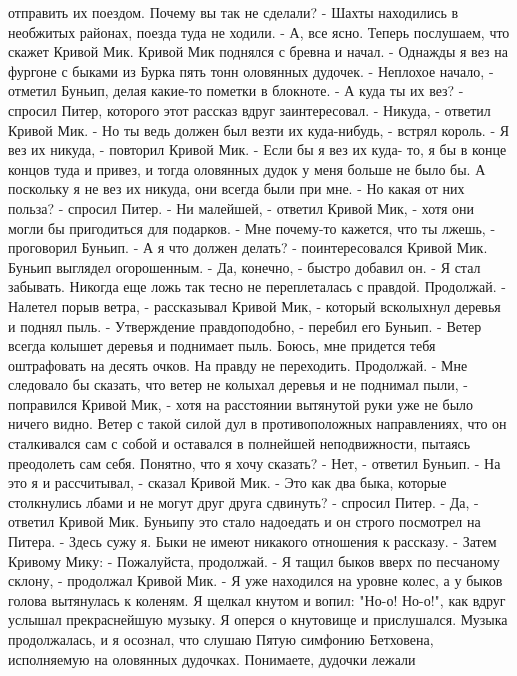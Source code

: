 отправить их поездом. Почему вы так не сделали?
    - Шахты находились в необжитых районах, поезда туда не ходили.
    - А, все ясно. Теперь послушаем, что скажет Кривой Мик.
    Кривой Мик поднялся с бревна и начал.
    - Однажды я вез на фургоне с быками из Бурка пять тонн оловянных 
дудочек.
    - Неплохое начало, - отметил Буньип, делая какие-то пометки в 
блокноте.
    - А куда ты их вез? - спросил Питер, которого этот рассказ вдруг 
заинтересовал.
    - Никуда, - ответил Кривой Мик.
    - Но ты ведь должен был везти их куда-нибудь, - встрял король.
    - Я вез их никуда, - повторил Кривой Мик. - Если бы я вез их куда-
то, я бы в конце концов туда и привез, и тогда оловянных дудок у меня 
больше не было бы. А поскольку я не вез их никуда, они всегда были при 
мне.
    - Но какая от них польза? - спросил Питер.
    - Ни малейшей, - ответил Кривой Мик, - хотя они могли бы 
пригодиться для подарков.
    - Мне почему-то кажется, что ты лжешь, - проговорил Буньип.
    - А я что должен делать? - поинтересовался Кривой Мик.
    Буньип выглядел огорошенным.
    - Да, конечно, - быстро добавил он. - Я стал забывать. Никогда еще 
ложь так тесно не переплеталась с правдой. Продолжай.
    - Налетел порыв ветра, - рассказывал Кривой Мик, - который 
всколыхнул деревья и поднял пыль.
    - Утверждение правдоподобно, - перебил его Буньип. - Ветер всегда 
колышет деревья и поднимает пыль. Боюсь, мне придется тебя оштрафовать 
на десять очков. На правду не переходить. Продолжай.
    - Мне следовало бы сказать, что ветер не колыхал деревья и не 
поднимал пыли, - поправился Кривой Мик, - хотя на расстоянии вытянутой 
руки уже не было ничего видно. Ветер с такой силой дул в 
противоположных направлениях, что он сталкивался сам с собой и 
оставался в полнейшей неподвижности, пытаясь преодолеть сам себя. 
Понятно, что я хочу сказать?
    - Нет, - ответил Буньип.
    - На это я и рассчитывал, - сказал Кривой Мик.
    - Это как два быка, которые столкнулись лбами и не могут друг 
друга сдвинуть? - спросил Питер.
    - Да, - ответил Кривой Мик.
    Буньипу это стало надоедать и он строго посмотрел на Питера.
    - Здесь сужу я. Быки не имеют никакого отношения к рассказу. - 
Затем Кривому Мику: - Пожалуйста, продолжай.
    - Я тащил быков вверх по песчаному склону, - продолжал Кривой Мик. 
- Я уже находился на уровне колес, а у быков голова вытянулась к 
коленям. Я щелкал кнутом и вопил: "Но-о! Но-о!", как вдруг услышал 
прекраснейшую музыку. Я оперся о кнутовище и прислушался. Музыка 
продолжалась, и я осознал, что слушаю Пятую симфонию Бетховена, 
исполняемую на оловянных дудочках. Понимаете, дудочки лежали 
